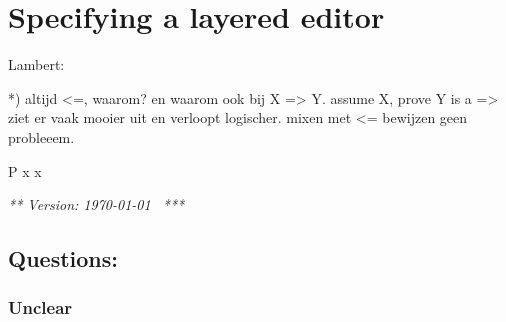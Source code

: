 \chapter{Specifying a layered editor}
\label{chap:singleLayer}


\bc
Lambert:

*) altijd <=, waarom? en waarom ook bij X => Y. assume X, prove Y is a =>
ziet er vaak mooier uit en verloopt logischer. mixen met <= bewijzen geen probleeem.

P x   \eq   x 



\ec
\renewcommand{\present}{\ensuremath{\mathit{present}}}
\renewcommand{\interpret}{\ensuremath{\mathit{interpret}}}
\newcommand{\spc}{\textvisiblespace}


\renewcommand{\H}{_{\, \mathrm H}}  %
\renewcommand{\L}{_{\, \mathrm L}} %
\newcommand{\M}{_{\, \mathrm M}}
\newcommand{\HH}{_{\, \mathrm {HH}}} 
\newcommand{\HL}{_{\, \mathrm {HL}}} 
\newcommand{\LH}{_{\, \mathrm {LH}}} 
\newcommand{\LL}{_{\, \mathrm {LL}}} 
\newcommand{\CH}{_{\, \mathrm {CH}}} 
\newcommand{\CL}{_{\, \mathrm {CL}}} 
\newcommand{\C}{_{\, \mathrm C}} 
\newcommand{\Eqclass}[2]{{#1}\!/_{{#2}}}
\newcommand{\eqclass}[2]{[\,{#1}\,]_{{#2}}}
\newcommand{\Eqcl}[2]{\Eqclass{#1}{_{\!\!{#2}}}}
\newcommand{\eqcl}[2]{\eqclass{#1}{\!_{#2}}}
\newcommand{\Eqstarcl}[2]{{#1}/_{\!\stackrel{*}{\simeq} {\mathrm {#2}}}}
\newcommand{\eqstarcl}[2]{[\,{#1}\,]_{\!\stackrel{*}{\simeq} {\mathrm {#2}}}}
\newcommand{\eqr}{\ensuremath{\simeq}}
\newcommand{\eqstar}{\ensuremath{\stackrel{*}{\simeq}}}
\newcommand{\reuz}{\ensuremath{\triangleright}}
\newcommand{\reuze}[1]{\ensuremath{\triangleright_{_{\!\!#1}}}}
\newcommand{\reuzestar}{\ensuremath{\stackrel{*}{\triangleright}}}
\newcommand{\rel}{\ensuremath{\sim}}




\newsavebox{\wpbox}
\sbox{\wpbox}{$\wp$}
\newcommand{\powerset}{\usebox{\wpbox}}



{\em *** Version: \today~ ***}


\section{Questions:}

\subsection{Unclear}

